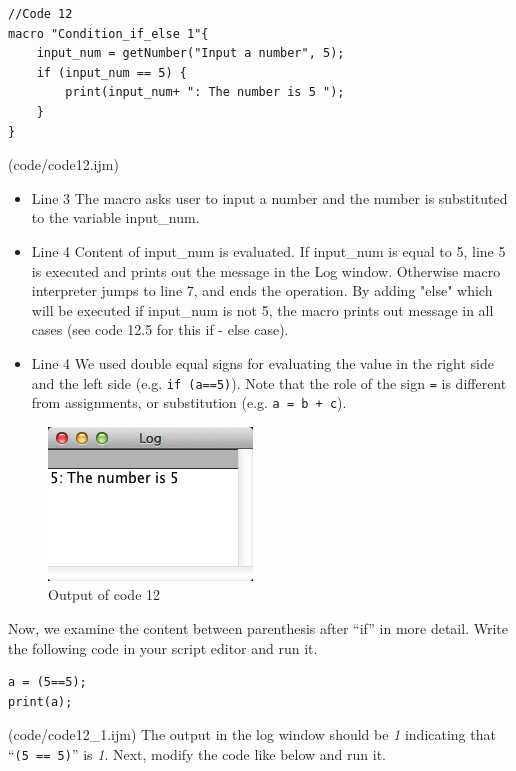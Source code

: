 \documentclass[11pt,a4paper,oneside]{report}
\newcommand{\ilcom}[1]{\texttt{\small#1}}
\begin{document}
\begin{lstlisting}[morekeywords={*, if}]
//Code 12
macro "Condition_if_else 1"{
	input_num = getNumber("Input a number", 5);
	if (input_num == 5) {
		print(input_num+ ": The number is 5 ");
	} 
}
\end{lstlisting}
(code/code12.ijm)
\begin{itemize}
\item Line 3 The macro asks user to input a number and the number is substituted to the variable input\_num.
\item Line 4 Content of input\_num is evaluated. If input\_num is equal to 5, line 5 is executed and prints out the message in the Log window. Otherwise macro interpreter jumps to line 7, and ends the operation.  By adding "else" which will be executed if input\_num is not 5, the macro prints out message in all cases (see code 12.5 for this if - else case). 
\item Line 4 We used double equal signs for evaluating the value in the right side and the left side (e.g. \ilcom{if (a==5)}). 
Note that the role of the sign \ilcom{=} is different from assignments, or substitution (e.g. \ilcom{a = b + c}).
\end{itemize}
\begin{figure}[htbp]
\begin{center}
\includegraphics[scale=0.6]{fig/fig2341_code12out.png}
\caption{Output of code 12}
\label{fig:code12 output}
\end{center}
\end{figure} 

Now, we examine the content between 
parenthesis after ``if'' in more detail. 
Write the following code in your script editor and run it.

\begin{lstlisting}[morekeywords={*, ==}]
a = (5==5);
print(a);

\end{lstlisting}
(code/code12_1.ijm)
The output in the log window should be \textit{1} indicating that ``\ilcom{(5 ==
5)}'' is \textit{1}. Next, modify the code like below and run it.
\end{document}

